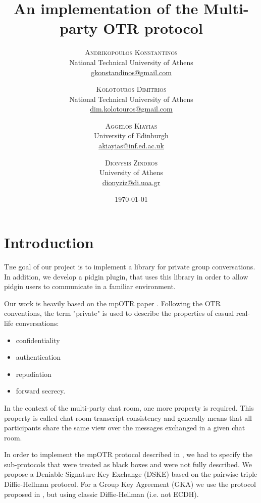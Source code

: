 \documentclass[]{article}
\title{An implementation of the Multi-party OTR protocol} %
\author{%
\textsc{Andrikopoulos Konstantinos}\\[1ex] %
\normalsize National Technical University of Athens \\ %
\normalsize \href{mailto:gkonstandinos@gmail.com}{gkonstandinos@gmail.com} %
\and %
\textsc{Kolotouros Dimitrios} \\[1ex] %
\normalsize National Technical University of Athens \\ %
\normalsize \href{dim.kolotouros@gmail.com}{dim.kolotouros@gmail.com}  %
\and %
\textsc{Aggelos Kiayias} \\[1ex] %
\normalsize University of Edinburgh \\ %
\normalsize \href{mailto:akiayias@inf.ed.ac.uk}{akiayias@inf.ed.ac.uk} \\[1ex]%
\and%
\textsc{Dionysis Zindros} \\[1ex] %
\normalsize University of Athens \\ %
\normalsize \href{mailto:dionyziz@di.uoa.gr}{dionyziz@di.uoa.gr} %
}
\date{\today} %
\begin{document}
\maketitle


\section{Introduction}

\lettrine[nindent=0em,lines=3]{T}he goal of our project is to implement a library for private group conversations.
In addition, we develop a pidgin plugin, that uses this library in order to allow pidgin users to communicate in a familiar environment.

Our work is heavily based on the mpOTR paper \cite{mpotr}.
Following the OTR conventions, the term "private" is used to describe the properties of casual real-life conversations:

\begin{itemize}
  \item confidentiality
  \item authentication
  \item repudiation
  \item forward secrecy.
\end{itemize}

In the context of the multi-party chat room, one more property is required.
This property is called chat room transcript consistency and generally means that all participants share the same view over the messages  exchanged in a given chat room.

In order to implement the mpOTR protocol described in \cite{mpotr}, we had to specify the sub-protocols that were treated as black boxes and were not fully described.
We propose a Deniable Signature Key Exchange (DSKE) based on the pairwise triple Diffie-Hellman protocol.
For a Group Key Agreement (GKA) we use the protocol proposed in \cite{mpenc}, but using classic Diffie-Hellman (i.e. not ECDH).

\end{document}
